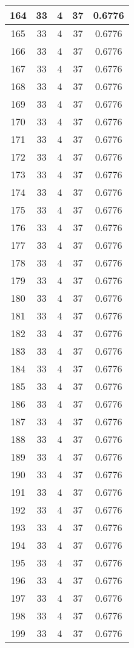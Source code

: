 \documentclass[letterpaper, 12pt]{article}
\begin{document}
\begin{longtable}{|c|c|c|c|c|}
\hline
164 & 33 & 4 & 37 & 0.6776 \\
\hline
165 & 33 & 4 & 37 & 0.6776 \\
\hline
166 & 33 & 4 & 37 & 0.6776 \\
\hline
167 & 33 & 4 & 37 & 0.6776 \\
\hline
168 & 33 & 4 & 37 & 0.6776 \\
\hline
169 & 33 & 4 & 37 & 0.6776 \\
\hline
170 & 33 & 4 & 37 & 0.6776 \\
\hline
171 & 33 & 4 & 37 & 0.6776 \\
\hline
172 & 33 & 4 & 37 & 0.6776 \\
\hline
173 & 33 & 4 & 37 & 0.6776 \\
\hline
174 & 33 & 4 & 37 & 0.6776 \\
\hline
175 & 33 & 4 & 37 & 0.6776 \\
\hline
176 & 33 & 4 & 37 & 0.6776 \\
\hline
177 & 33 & 4 & 37 & 0.6776 \\
\hline
178 & 33 & 4 & 37 & 0.6776 \\
\hline
179 & 33 & 4 & 37 & 0.6776 \\
\hline
180 & 33 & 4 & 37 & 0.6776 \\
\hline
181 & 33 & 4 & 37 & 0.6776 \\
\hline
182 & 33 & 4 & 37 & 0.6776 \\
\hline
183 & 33 & 4 & 37 & 0.6776 \\
\hline
184 & 33 & 4 & 37 & 0.6776 \\
\hline
185 & 33 & 4 & 37 & 0.6776 \\
\hline
186 & 33 & 4 & 37 & 0.6776 \\
\hline
187 & 33 & 4 & 37 & 0.6776 \\
\hline
188 & 33 & 4 & 37 & 0.6776 \\
\hline
189 & 33 & 4 & 37 & 0.6776 \\
\hline
190 & 33 & 4 & 37 & 0.6776 \\
\hline
191 & 33 & 4 & 37 & 0.6776 \\
\hline
192 & 33 & 4 & 37 & 0.6776 \\
\hline
193 & 33 & 4 & 37 & 0.6776 \\
\hline
194 & 33 & 4 & 37 & 0.6776 \\
\hline
195 & 33 & 4 & 37 & 0.6776 \\
\hline
196 & 33 & 4 & 37 & 0.6776 \\
\hline
197 & 33 & 4 & 37 & 0.6776 \\
\hline
198 & 33 & 4 & 37 & 0.6776 \\
\hline
199 & 33 & 4 & 37 & 0.6776 \\
\hline
\end{longtable}
\end{document}
